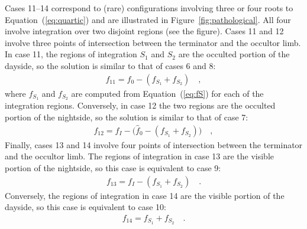\documentclass[modern]{aastex62}
\begin{document}
Cases 11--14 correspond to (rare) configurations involving three
or four roots to Equation~(\ref{eq:quartic}) and are
illustrated in Figure~\ref{fig:pathological}. All four involve integration over
two disjoint regions (see the figure).
%
Cases 11 and 12 involve three points of intersection between the terminator
and the occultor limb. In case 11, the regions of integration $S_1$ and
$S_2$ are the
occulted portion of the dayside, so the solution is similar to
that of cases 6 and 8:
%
\begin{align}
    \label{eq:f11}
    f_{11} = f_0 - (f_{S_1} + f_{S_2})
    \quad,
\end{align}
%
where $f_{S_1}$ and $f_{S_2}$ are computed from Equation~(\ref{eq:fS}) for
each of the integration regions. Conversely, in case 12 the two regions
are the occulted portion of the nightside, so the solution is similar to that
of case 7:
%
\begin{align}
    \label{eq:f12}
    f_{12} = f_I - \big(\hat{f}_0 - (f_{S_1} + f_{S_2})\big)
    \quad,
\end{align}
%
Finally, cases 13 and 14 involve four points of intersection between the
terminator and the occultor limb. The regions of integration in case 13 are
the visible portion of the nightside, so this case is equivalent to case 9:
%
\begin{align}
    \label{eq:f13}
    f_{13} = f_I - (f_{S_1} + f_{S_2})
    \quad.
\end{align}
%
Conversely, the regions of integration in case 14 are the
visible portion of the dayside, so this case is equivalent to case 10:
%
\begin{align}
    \label{eq:f14}
    f_{14} = f_{S_1} + f_{S_2}
    \quad.
\end{align}
%
\end{document}
